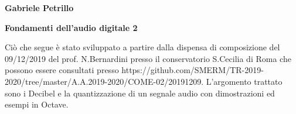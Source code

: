 \documentclass[11pt]{article}
\begin{document}
\begin{minipage}{0.55\linewidth}
\vspace{0.3cm}
{\large{\textbf{\textsf{Gabriele Petrillo}}}}\\\end{minipage}

\vspace{0.3cm}
\begin{minipage}{0.95\linewidth}
\begin{center}
{\huge{\textbf{\textsf{Fondamenti dell'audio digitale 2}}}} \\
\end{center}
\end{minipage}
\vspace*{0.2cm}


\begin{center}
\begin{minipage}[c]{14cm}
\begin{textit}

Ciò che segue è stato sviluppato a partire dalla dispensa di composizione del 09/12/2019 del prof. N.Bernardini presso il conservatorio S.Cecilia di Roma che possono essere consultati presso https://github.com/SMERM/TR-2019-2020/tree/master/A.A.2019-2020/COME-02/20191209. L'argomento trattato sono i Decibel e la quantizzazione di un segnale audio con dimostrazioni ed esempi in Octave.

\end{textit}
\end{minipage}
\end{center}
\vspace*{0.2cm}

\end{document}
